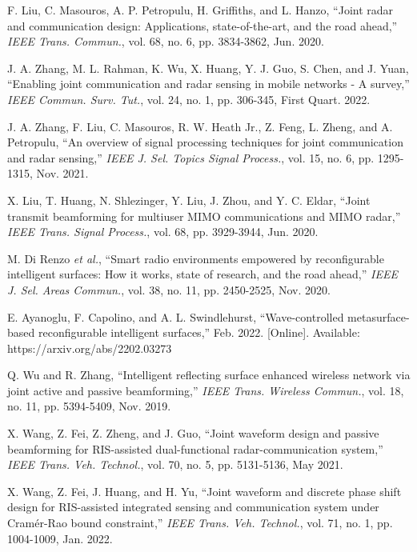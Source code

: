 \documentclass[Conference,a4paper]{IEEEtran}
\begin{document}
\begin{thebibliography}{99}

 F. Liu, C. Masouros, A. P. Petropulu, H. Griffiths, and L. Hanzo, ``Joint radar and communication design: Applications, state-of-the-art, and the road ahead,'' \textit{IEEE Trans. Commun.}, vol. 68, no. 6, pp. 3834-3862, Jun. 2020.

 J. A. Zhang, M. L. Rahman, K. Wu, X. Huang, Y. J. Guo, S. Chen, and J. Yuan, ``Enabling joint communication and radar sensing in mobile networks - A survey,'' \textit{IEEE Commun. Surv. Tut.}, vol. 24, no. 1, pp. 306-345, First Quart. 2022.


 J. A. Zhang, F. Liu, C. Masouros, R. W. Heath Jr., Z. Feng, L. Zheng, and A. Petropulu, ``An overview of signal processing techniques for joint communication and radar sensing,'' \textit{IEEE J. Sel. Topics Signal Process.}, vol. 15, no. 6, pp. 1295-1315, Nov. 2021.

 X. Liu, T. Huang, N. Shlezinger, Y. Liu, J. Zhou, and Y. C. Eldar, ``Joint transmit beamforming for multiuser MIMO communications and MIMO radar,'' \textit{IEEE Trans. Signal Process.}, vol. 68, pp. 3929-3944, Jun. 2020.

 M. Di Renzo \textit{et al.}, ``Smart radio environments empowered by reconfigurable intelligent surfaces: How it works, state of research, and the road ahead,'' \textit{IEEE J. Sel. Areas Commun.}, vol. 38, no. 11, pp. 2450-2525, Nov. 2020.

 E. Ayanoglu, F. Capolino, and A. L. Swindlehurst, ``Wave-controlled metasurface-based reconfigurable intelligent surfaces,'' Feb. 2022. [Online]. Available: https://arxiv.org/abs/2202.03273

 Q. Wu and R. Zhang, ``Intelligent reflecting surface enhanced wireless network via joint active and passive beamforming,'' \textit{IEEE Trans. Wireless Commun.}, vol. 18, no. 11, pp. 5394-5409, Nov. 2019.

 X. Wang, Z. Fei, Z. Zheng, and J. Guo, ``Joint waveform design and passive beamforming for RIS-assisted dual-functional radar-communication system,'' \textit{IEEE Trans. Veh. Technol.}, vol. 70, no. 5, pp. 5131-5136, May 2021.

 X. Wang, Z. Fei, J. Huang, and H. Yu, ``Joint waveform and discrete phase shift design for RIS-assisted integrated sensing and communication system under Cram\'{e}r-Rao bound constraint,'' \textit{IEEE Trans. Veh. Technol.}, vol. 71, no. 1, pp. 1004-1009, Jan. 2022.


\end{thebibliography}
\end{document}
